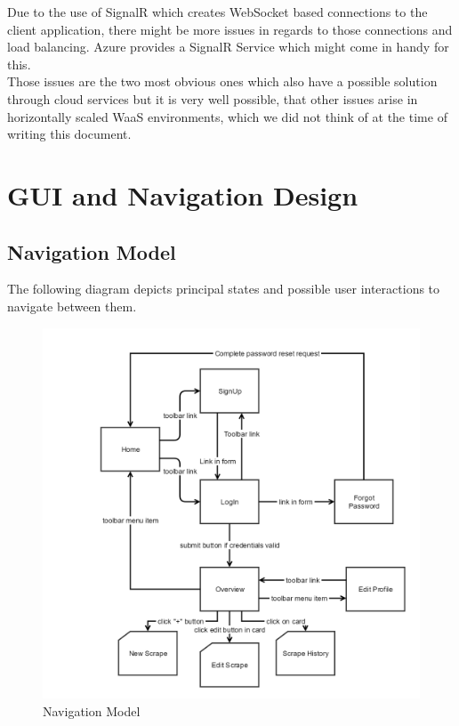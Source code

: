 \documentclass[titlepage, 12pt]{article}
\begin{document}
\begin{enumerate}
\begin{enumerate}
          Due to the use of SignalR which creates WebSocket based connections to the client application, there might be more issues in regards to those connections and load balancing. Azure provides a SignalR Service which might come in handy for this.\\
          Those issues are the two most obvious ones which also have a possible solution through cloud services but it is very well possible, that other issues arise in horizontally scaled WaaS environments, which we did not think of at the time of writing this document. 
          
        \end{enumerate}
\end{enumerate}

\section{GUI and Navigation Design}
\subsection{Navigation Model}

The following diagram depicts principal states and possible user interactions to navigate between them.

\begin{figure}[H]
  \includegraphics[width=0.95\linewidth]{navigationmodel_waas.png}
  \caption{Navigation Model}
  \label{fig:navigationModel}
\end{figure}
\end{document}
